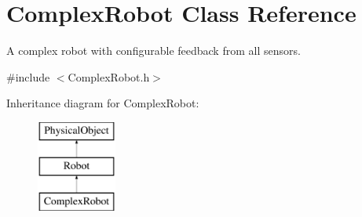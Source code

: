 \hypertarget{classComplexRobot}{\section{Complex\-Robot Class Reference}
\label{classComplexRobot}
}


A complex robot with configurable feedback from all sensors.  




{\ttfamily \#include $<$Complex\-Robot.\-h$>$}

Inheritance diagram for Complex\-Robot\-:\begin{figure}[H]
\begin{center}
\leavevmode
\includegraphics[height=3.000000cm]{classComplexRobot}
\end{center}
\end{figure}
